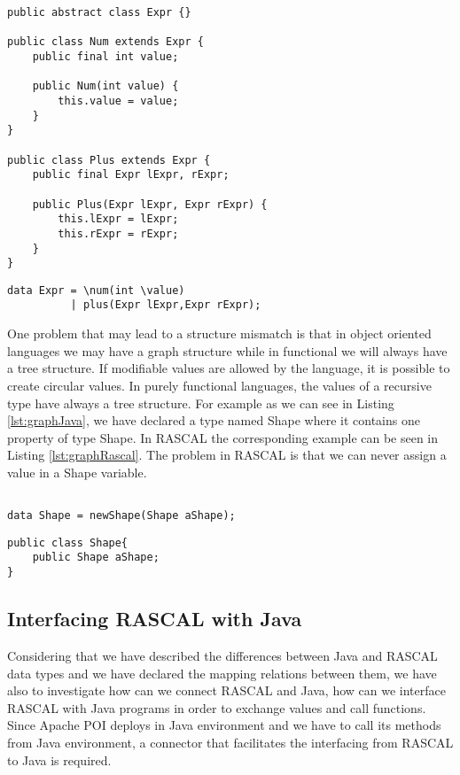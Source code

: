 \begin{lstlisting}[label=lst:recJava,caption=A Recursive type declaration in Java.]
public abstract class Expr {}

public class Num extends Expr {
	public final int value;
	
	public Num(int value) {
		this.value = value;
	}
}

public class Plus extends Expr {
	public final Expr lExpr, rExpr;
	
	public Plus(Expr lExpr, Expr rExpr) {
		this.lExpr = lExpr;
		this.rExpr = rExpr;
	}
}
\end{lstlisting}

\begin{lstlisting}[label=lst:recRascal,caption=Mapping of a Recursive type in RASCAL.]
data Expr = \num(int \value)
		  | plus(Expr lExpr,Expr rExpr);
\end{lstlisting}

One problem that may lead to a structure mismatch is that in object oriented languages we may have a graph structure while in functional we will always have a tree structure. If modifiable values are allowed by the language, it is possible to create circular values. In purely functional languages, the values of a recursive type have always a tree structure\cite{paradigms}. For example as we can see in Listing \ref{lst:graphJava}, we have declared a type named Shape where it contains one property of type Shape. In RASCAL the corresponding example can be seen in Listing \ref{lst:graphRascal}. The problem in RASCAL is that we can never assign a value in a Shape variable.

\begin{lstlisting}[label=lst:graphRascal,caption=Graph type in RASCAL.]

data Shape = newShape(Shape aShape);
\end{lstlisting}

\begin{lstlisting}[label=lst:graphJava,caption=Graph type in Java.]
public class Shape{
	public Shape aShape;
}
\end{lstlisting}
 
\subsection{Interfacing RASCAL with Java}

Considering that we have described the differences between Java and RASCAL data types and we have declared the mapping relations between them, we have also to investigate how can we connect RASCAL and Java, how can we interface RASCAL with Java programs in order to exchange values and call functions. Since Apache POI deploys in Java environment and we have to call its methods from Java environment, a connector that facilitates the interfacing from RASCAL to Java is required.

